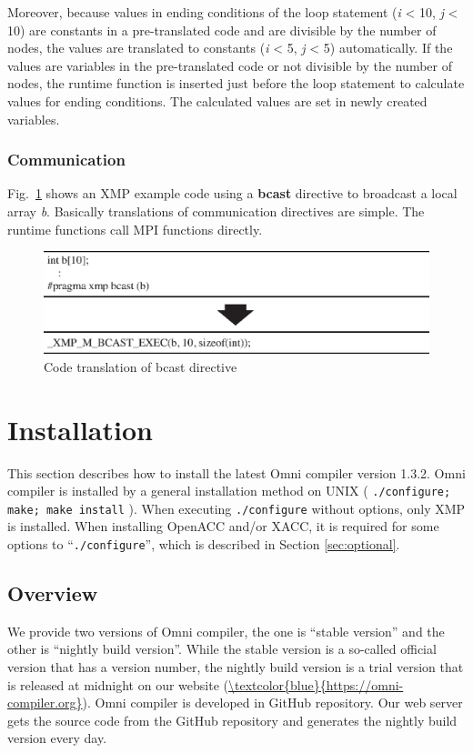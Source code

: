 \documentclass[graybox]{svmult}
\begin{document}
Moreover, because values in ending conditions of the loop statement ({\it i} < 10, {\it j} < 10) are constants in a pre-translated code and are divisible by the number of nodes,
the values are translated to constants  ({\it i} < 5, {\it j} < 5) automatically.
If the values are variables in the pre-translated code or not divisible by the number of nodes,
the runtime function is inserted just before the loop statement to calculate values for ending conditions.
The  calculated values are set in newly created variables.
\subsubsection{Communication}
Fig.~\ref{fig:translation-bcast} shows an XMP example code using a {\bf bcast} directive to broadcast a local array {\it b}. 
Basically translations of communication directives are simple.
The runtime functions call MPI functions directly.
\begin{figure}[h]
\sidecaption
\includegraphics[scale=.75]{img/translation-bcast.eps}
\caption{Code translation of bcast directive} \label{fig:translation-bcast}
\end{figure}
\section{Installation}
This section describes how to install the latest Omni compiler version 1.3.2.
Omni compiler is installed by a general installation method on UNIX ( {\tt ./configure; make; make install} ).
When executing {\tt ./configure} without options, only XMP is installed. 
When installing OpenACC and/or XACC, 
it is required for some options to ``{\tt ./configure}'', which is described in Section \ref{sec:optional}.
\subsection{Overview}
We provide two versions of Omni compiler, the one is ``stable version'' and the other is ``nightly build version''.
While the stable version is a so-called official version that has a version number, 
the nightly build version is a trial version that is released at midnight on our website (\url{\textcolor{blue}{https://omni-compiler.org}}).
Omni compiler is developed in GitHub repository\cite{github}.
Our web server gets the source code from the GitHub repository and generates the nightly build version every day.
\end{document}
